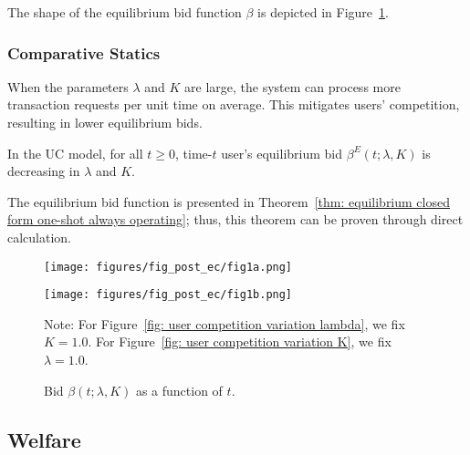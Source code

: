 \documentclass[12pt, letterpaper]{article}
\begin{document}
The shape of the equilibrium bid function $\beta$ is depicted in Figure~\ref{fig: user competition variation lambda and K}.

\subsubsection{Comparative Statics}

When the parameters $\lambda$ and $K$ are large, the system can process more transaction requests per unit time on average. This mitigates users' competition, resulting in lower equilibrium bids.

\begin{prop}
    In the UC model, for all $t \ge 0$, time-$t$ user's equilibrium bid $\beta^E(t; \lambda, K)$ is decreasing in $\lambda$ and $K$.
\end{prop}

The equilibrium bid function is presented in Theorem~\ref{thm: equilibrium closed form one-shot always operating}; thus, this theorem can be proven through direct calculation.

\begin{figure}[tb]
    \centering
    \begin{minipage}[t]{0.475\textwidth}
        \centering
        \texttt{[image: figures/fig\_post\_ec/fig1a.png]}
        \label{fig: user competition variation lambda}
    \end{minipage}
    \hfill
    \begin{minipage}[t]{0.475\textwidth}  
        \centering 
        \texttt{[image: figures/fig\_post\_ec/fig1b.png]}
        \label{fig: user competition variation K}
    \end{minipage}
    \caption{Bid $\beta(t; \lambda, K)$ as a function of $t$.}
    \begin{center}\footnotesize
        Note: For Figure~\ref{fig: user competition variation lambda}, we fix $K = 1.0$. For Figure~\ref{fig: user competition variation K}, we fix $\lambda = 1.0$.
    \end{center}
    \label{fig: user competition variation lambda and K}
\end{figure}







\subsection{Welfare}\label{subsec: user competition welfare}
\end{document}

